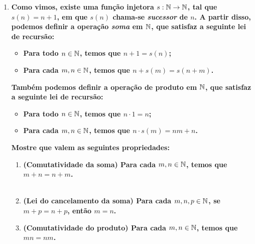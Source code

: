 \documentclass[%
  a4paper,%
  12pt,%
  fleqn,%
  english,%
  brazilian,%
]{article}
\begin{document}
\begin{enumerate}[wide, labelwidth=!, labelindent=0pt]
  \item \textbf{Como vimos, existe uma função injetora $s: \mathbb N \rightarrow \mathbb N$, tal que $s(n) = n+1$, em que 
    $s(n)$ chama-se \textit{sucessor} de $n$. A partir disso, podemos definir a operação \textit{soma} em 
    $\mathbb N$, que satisfaz a seguinte lei de recursão: }\\
  \begin{itemize}
    \item \textbf{Para todo $n \in \mathbb N$, temos que $n+1 = s(n)$;}
    \item \textbf{Para cada $m, n \in \mathbb N$, temos que $n + s(m) = s(n+m)$.}
  \end{itemize}
  \vspace{3mm}
  \textbf{Também podemos definir a operação de produto em $\mathbb N$, que satisfaz a seguinte lei de recursão:}\\
  \begin{itemize}
    \item \textbf{Para todo $n\in \mathbb N$, temos que $n\cdot 1 = n$;}
    \item \textbf{Para cada $m, n \in \mathbb N$, temos que $n\cdot s(m) = nm+n$.}
  \end{itemize}
    \vspace{3mm}
    \textbf{Mostre que valem as seguintes propriedades:}
  \begin{enumerate}[label=\alph*)]
      \item \textbf{(Comutatividade da soma) Para cada $m, n \in \mathbb N$, temos que $m+n = n+m$.}\\
        \\
      \item \textbf{(Lei do cancelamento da soma) Para cada $m, n, p \in \mathbb N$, se $m+p = n+ p$, então $m=n$.}
        \\

      \item \textbf{(Comutatividade do produto) Para cada $m, n \in \mathbb N$, temos que $mn = nm$.}\\
        \\

  \end{enumerate} 
	  \vspace{3mm}
  
\end{enumerate}
\end{document}
